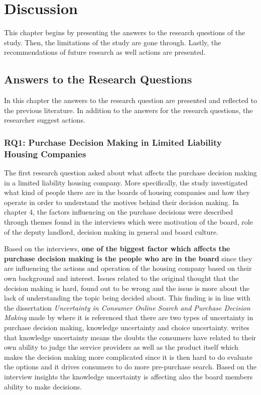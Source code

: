 \chapter{Discussion}
\label{chapter:discussion}

This chapter begins by presenting the answers to the research questions of the study. Then, the limitations of the study are gone through. Lastly, the recommendations of future research as well actions are presented.

\section{Answers to the Research Questions}

In this chapter the answers to the research question are presented and reflected to the previous literature. In addition to the answers for the research questions, the researcher suggest actions.

\subsection{RQ1: Purchase Decision Making in Limited Liability Housing Companies}

The first research question asked about what affects the purchase decision making in a limited liability housing company. More specifically, the study investigated what kind of people there are in the boards of housing companies and how they operate in order to understand the motives behind their decision making. In chapter 4, the factors influencing on the purchase decisions were described through themes found in the interviews which were motivation of the board, role of the deputy landlord, decision making in general and board culture.

Based on the interviews, \textbf{one of the biggest factor which affects the purchase decision making is the people who are in the board} since they are influencing the actions and operation of the housing company based on their own background and interest. Issues related to the original thought that the decision making is hard, found out to be wrong and the issue is more about the lack of understanding the topic being decided about. This finding is in line with the dissertation \emph{Uncertainty in Consumer Online Search and Purchase Decision Making} made by \textcite{PurchaseDecisionMaking:2011} where it is referenced that there are two types of uncertainty in purchase decision making, knowledge uncertainty and choice uncertainty. \textcite{PurchaseDecisionMaking:2011} writes that knowledge uncertainty means the doubts the consumers have related to their own ability to judge the service providers as well as the product itself which makes the decision making more complicated since it is then hard to do evaluate the options and it drives consumers to do more pre-purchase search. Based on the interview insights the knowledge uncertainty is affecting also the board members ability to make decisions.

